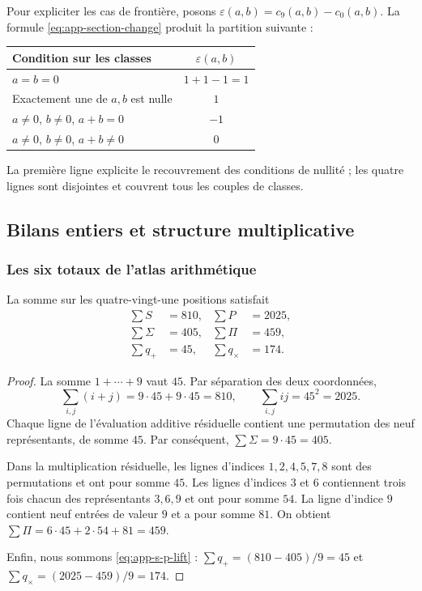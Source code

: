 Pour expliciter les cas de frontière, posons $\varepsilon(a,b)=c_9(a,b)-c_0(a,b)$. La formule \eqref{eq:app-section-change} produit la partition suivante :
\begin{tablacompleta}[H]
\caption{Correction de la retenue sous un changement de section.}
\label{tab:app-casos-seccion}
\begin{tabular}{lc}
\toprule
Condition sur les classes & $\varepsilon(a,b)$\\
\midrule
$a=b=0$ & $1+1-1=1$\\
Exactement une de $a,b$ est nulle & $1$\\
$a\neq0$, $b\neq0$, $a+b=0$ & $-1$\\
$a\neq0$, $b\neq0$, $a+b\neq0$ & $0$\\
\bottomrule
\end{tabular}
\end{tablacompleta}
La première ligne explicite le recouvrement des conditions de nullité ; les quatre lignes sont disjointes et couvrent tous les couples de classes.

\subsection{Bilans entiers et structure multiplicative}
\label{sec:app-balances}

\subsubsection{Les six totaux de l'atlas arithmétique}

\begin{bloqueindivisible}
\begin{proposicion}
\label{prop:app-totales}
La somme sur les quatre-vingt-une positions satisfait
\begin{align}
 \sum S&=810, &\sum P&=2025,\\
 \sum\Sigma&=405, &\sum\Pi&=459,\\
 \sum q_+&=45, &\sum q_\times&=174.
 \label{eq:app-six-totals}
\end{align}
\end{proposicion}

\begin{proof}
La somme $1+\cdots+9$ vaut $45$. Par séparation des deux coordonnées,
\[
 \sum_{i,j}(i+j)=9\cdot45+9\cdot45=810,
 \qquad \sum_{i,j}ij=45^2=2025.
\]
Chaque ligne de l'évaluation additive résiduelle contient une permutation des neuf représentants, de somme $45$. Par conséquent, $\sum\Sigma=9\cdot45=405$.

Dans la multiplication résiduelle, les lignes d'indices $1,2,4,5,7,8$ sont des permutations et ont pour somme $45$. Les lignes d'indices $3$ et $6$ contiennent trois fois chacun des représentants $3,6,9$ et ont pour somme $54$. La ligne d'indice $9$ contient neuf entrées de valeur $9$ et a pour somme $81$. On obtient $\sum\Pi=6\cdot45+2\cdot54+81=459$.

Enfin, nous sommons \eqref{eq:app-s-p-lift} : $\sum q_+=(810-405)/9=45$ et $\sum q_\times=(2025-459)/9=174$.
\end{proof}
\end{bloqueindivisible}

